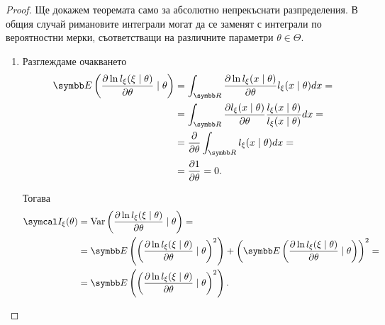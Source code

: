 \documentclass[numbers=endperiod, bibliography=totocnumbered]{scrartcl}
\begin{document}
\begin{proof}
  Ще докажем теоремата само за абсолютно непрекъснати разпределения. В общия случай римановите интеграли могат да се заменят с интеграли по вероятностни мерки, съответстващи на различните параметри \( \theta \in \Theta \).
  \begin{enumerate}
    \item Разглеждаме очакването
    \begin{align*}
      \Expect\left( \frac {\partial \ln l_\xi(\xi \mid \theta)} {\partial \theta} \mid \theta \right)
      &=
      \int_{\R} \frac {\partial \ln l_\xi(x \mid \theta)} {\partial \theta} l_\xi(x \mid \theta) dx
      = \\ &=
      \int_{\R} \frac {\partial l_\xi(x \mid \theta)} {\partial \theta} \frac {l_\xi(x \mid \theta)} {l_\xi(x \mid \theta)} dx
      = \\ &=
      \frac \partial {\partial \theta} \int_{\R} l_\xi(x \mid \theta) dx
      = \\ &=
      \frac {\partial 1} {\partial \theta}
      =
      0.
    \end{align*}

    Тогава
    \begin{align*}
      \FisherInfo_\xi(\theta)
      &=
      \Var\left( \frac {\partial \ln l_\xi(\xi \mid \theta)} {\partial \theta} \mid \theta \right)
      = \\ &=
      \Expect\left( {\left( \frac {\partial \ln l_\xi(\xi \mid \theta)} {\partial \theta} \mid \theta \right)}^2 \right) + {\left(\Expect\left( \frac {\partial \ln l_\xi(\xi \mid \theta)} {\partial \theta} \mid \theta \right)\right)}^2
      = \\ &=
      \Expect\left( {\left( \frac {\partial \ln l_\xi(\xi \mid \theta)} {\partial \theta} \mid \theta \right)}^2 \right).
    \end{align*}


\end{enumerate}
\end{proof}
\end{document}
